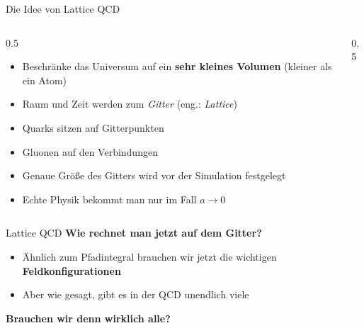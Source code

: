 \documentclass[
  ignorenonframetext,
  ngerman,
]{beamer}
\providecommand{\tightlist}{%
  \setlength{\itemsep}{0pt}\setlength{\parskip}{0pt}}
\begin{document}
\begin{frame}{Die Idee von Lattice QCD}
\label{die-idee-von-lattice-qcd}
\begin{columns}[T]
\begin{column}{0.5\linewidth}
\begin{itemize}
\tightlist
\item
  Beschränke das Universum auf ein \textbf{sehr kleines Volumen}
  (kleiner als ein Atom)
\item
  Raum und Zeit werden zum \emph{Gitter} (eng.: \emph{Lattice})
\item
  Quarks sitzen auf Gitterpunkten
\item
  Gluonen auf den Verbindungen
\item
  Genaue Größe des Gitters wird vor der Simulation festgelegt
\item
  Echte Physik bekommt man nur im Fall \emph{\(a \rightarrow 0\)}
\end{itemize}
\end{column}

\begin{column}{0.5\linewidth}
\end{column}
\end{columns}

\end{frame}

\begin{frame}{Lattice QCD}
\label{lattice-qcd}
\textbf{Wie rechnet man jetzt auf dem Gitter?}

\begin{itemize}
\tightlist
\item
  Ähnlich zum Pfadintegral brauchen wir jetzt die wichtigen
  \textbf{Feldkonfigurationen}
\item
  Aber wie gesagt, gibt es in der QCD unendlich viele
\end{itemize}

\pause

\textbf{Brauchen wir denn wirklich alle?}
\end{frame}
\end{document}
